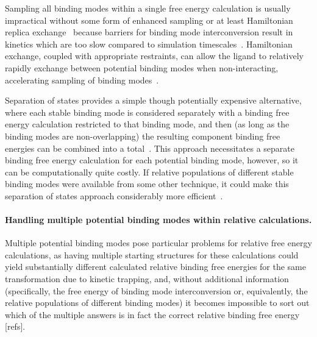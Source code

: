 \documentclass[9pt,bestpractices]{livecoms}
\begin{document}
Sampling all binding modes within a single free energy calculation is usually impractical without some form of enhanced sampling or at least Hamiltonian replica exchange~\cite{Wang:2013:JournalofComputer-AidedMolecularDesign} because barriers for binding mode interconversion result in kinetics which are too slow compared to simulation timescales~\cite{Mobley:2006:TheJournalofChemicalPhysics, Palma:2012:J.Comput.Chem., Mobley:2012:TheJournalofChemicalPhysics, Gill:2018:J.Phys.Chem.B}.
Hamiltonian exchange, coupled with appropriate restraints, can allow the ligand to relatively rapidly exchange between potential binding modes when non-interacting, accelerating sampling of binding modes~\cite{Wang:2013:JournalofComputer-AidedMolecularDesign}.

Separation of states provides a simple though potentially expensive alternative, where each stable binding mode is considered separately with a binding free energy calculation restricted to that binding mode, and then (as long as the binding modes are non-overlapping) the resulting component binding free energies can be combined into a total~\cite{Mobley:2006:TheJournalofChemicalPhysics, Mobley:2012:TheJournalofChemicalPhysics}.
This approach necessitates a separate binding free energy calculation for each potential binding mode, however, so it can be computationally quite costly.
If relative populations of different stable binding modes were available from some other technique, it could make this separation of states approach considerably more efficient~\cite{Mobley:2012:TheJournalofChemicalPhysics, Gill:2018:J.Phys.Chem.B}.

\paragraph{Handling multiple potential binding modes within relative calculations.}

Multiple potential binding modes pose particular problems for relative free energy calculations, as having multiple starting structures for these calculations could yield substantially different calculated relative binding free energies for the same transformation due to kinetic trapping, and, without additional information (specifically, the free energy of binding mode interconversion or, equivalently, the relative populations of different binding modes) it becomes impossible to sort out which of the multiple answers is in fact the correct relative binding free energy [refs].
\end{document}
